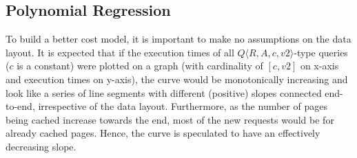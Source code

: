 \documentclass{article}
\begin{document}
\begin{multicols}{2}
		\section{Polynomial Regression}
	\label{sec:poly}
	To build a better cost model, it is important to make no assumptions on the data layout. It is expected that if the execution times of all $Q \langle R,A,c,v2 \rangle $-type queries ($c$ is a constant) were plotted on a graph (with cardinality of $[c,v2]$ on x-axis and execution times on y-axis), the curve would be monotonically increasing and look like a series of line segments with different (positive) slopes connected end-to-end, irrespective of the data layout. Furthermore, as the number of pages being cached increase towards the end, most of the new requests would be for already cached pages. Hence, the curve is speculated to have an effectively decreasing slope.
	
\end{multicols}
\end{document}
